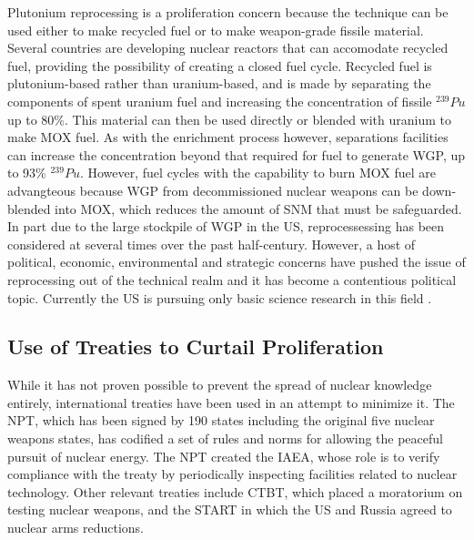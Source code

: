 Plutonium reprocessing is a proliferation concern because the technique can be used either to make recycled fuel or to make weapon-grade fissile material.  Several countries are developing nuclear reactors that can accomodate recycled fuel, providing the possibility of creating a closed fuel cycle\cite{_processing_2015}.  Recycled fuel is plutonium-based rather than uranium-based, and is made by separating the components of spent uranium fuel and increasing the concentration of fissile $^{239}Pu$ up to 80\%.  This material can then be used directly or blended with uranium to make \gls{MOX} fuel.  As with the enrichment process however, separations facilities can increase the concentration beyond that required for fuel to generate \gls{WGP}, up to 93\% $^{239}Pu$.  However, fuel cycles with the capability to burn \gls{MOX} fuel are advangteous because \gls{WGP} from decommissioned nuclear weapons can be down-blended into \gls{MOX}, which reduces the amount of \gls{SNM} that must be safeguarded.  In part due to the large stockpile of \gls{WGP} in the \gls{US}, reprocessessing has been considered at several times over the past half-century.  However, a host of political, economic, environmental and strategic concerns have pushed the issue of reprocessing out of the technical realm and it has become a contentious political topic\cite{rossin_policy_????}.  Currently the \gls{US} is pursuing only basic science research in this field \cite{editorial_adieu_2009}.
 
\subsection{Use of Treaties to Curtail Proliferation}

While it has not proven possible to prevent the spread of nuclear knowledge entirely, international treaties have been used in an attempt to minimize it.  The \gls{NPT}, which has been signed by 190 states including the original five nuclear weapons states, has codified a set of rules and norms for allowing the peaceful pursuit of nuclear energy\cite{_treaty_????}.  The \gls{NPT} created the \gls{IAEA}, whose role is to verify compliance with the treaty by periodically inspecting facilities related to nuclear technology.  Other relevant treaties include \gls{CTBT}, which placed a moratorium on testing nuclear weapons, and the \gls{START} in which the \gls{US} and Russia agreed to nuclear arms reductions.

